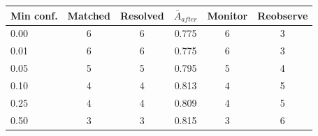 \begin{tabular}{lccccc}
\toprule
Min conf. & Matched & Resolved & $\bar{A}_{after}$ & Monitor & Reobserve \\
\midrule
0.00 & 6 & 6 & 0.775 & 6 & 3 \\
0.01 & 6 & 6 & 0.775 & 6 & 3 \\
0.05 & 5 & 5 & 0.795 & 5 & 4 \\
0.10 & 4 & 4 & 0.813 & 4 & 5 \\
0.25 & 4 & 4 & 0.809 & 4 & 5 \\
0.50 & 3 & 3 & 0.815 & 3 & 6 \\
\bottomrule
\end{tabular}
